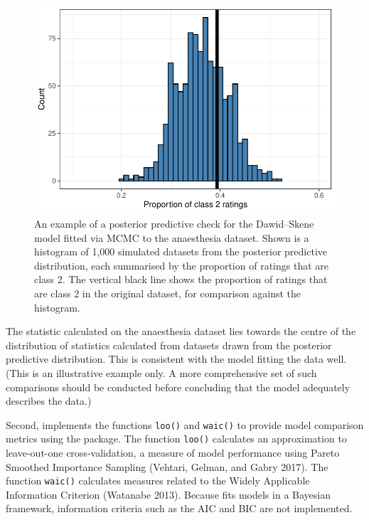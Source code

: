 \begin{figure}

{\centering \includegraphics{RJ-2023-064_files/figure-latex/plot-ppcs-1} 

}

\caption{An example of a posterior predictive check for the Dawid--Skene model fitted via MCMC to the anaesthesia dataset.  Shown is a histogram of 1,000 simulated datasets from the posterior predictive distribution, each summarised by the proportion of ratings that are class 2.  The vertical black line shows the proportion of ratings that are class 2 in the original dataset, for comparison against the histogram.}\label{fig:plot-ppcs}
\end{figure}

The statistic calculated on the anaesthesia dataset lies towards the centre of
the distribution of statistics calculated from datasets drawn from the
posterior predictive distribution. This is consistent with the model fitting
the data well. (This is an illustrative example only. A more comprehensive
set of such comparisons should be conducted before concluding that the model
adequately describes the data.)

Second,  implements the functions \texttt{loo()} and \texttt{waic()}
to provide model comparison metrics using the  package. The
function \texttt{loo()} calculates an approximation to leave-out-one
cross-validation, a measure of model performance using Pareto Smoothed
Importance Sampling (Vehtari, Gelman, and Gabry 2017). The function \texttt{waic()} calculates
measures related to the Widely Applicable Information Criterion
(Watanabe 2013). Because  fits models in a Bayesian
framework, information criteria such as the AIC and BIC are not implemented.

